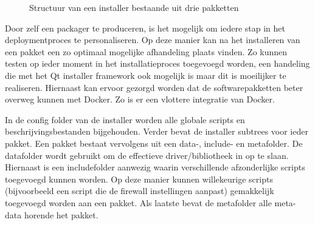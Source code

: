 \begin{figure}[!ht]
\centering
{}
\caption{Structuur van een installer bestaande uit drie pakketten}
\label{fig:installerStructuur}
\end{figure}

Door zelf een packager te produceren, is het mogelijk om iedere stap in het deploymentproces te personaliseren.
Op deze manier kan na het installeren van een pakket een zo optimaal mogelijke afhandeling plaats vinden.
Zo kunnen testen op ieder moment in het installatieproces toegevoegd worden, een handeling die met het Qt installer framework ook mogelijk is maar dit is moeilijker te realiseren.
Hiernaast kan ervoor gezorgd worden dat de softwarepakketten beter overweg kunnen met Docker.
Zo is er een vlottere integratie van Docker.

In de config folder van de installer worden alle globale scripts en beschrijvingsbestanden bijgehouden.
Verder bevat de installer subtrees voor ieder pakket.
Een pakket bestaat vervolgens uit een data-, include- en metafolder.
De datafolder wordt gebruikt om de effectieve driver/bibliotheek in op te slaan.
Hiernaast is een includefolder aanwezig waarin verschillende afzonderlijke scripts toegevoegd kunnen worden.
Op deze manier kunnen willekeurige scripts (bijvoorbeeld een script die de firewall instellingen aanpast) gemakkelijk toegevoegd worden aan een pakket.
Als laatste bevat de metafolder alle meta-data horende het pakket.

